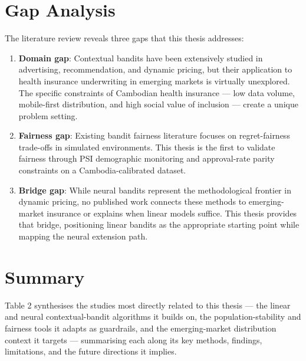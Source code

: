 \section{Gap Analysis}\label{gap-analysis}

The literature review reveals three gaps that this thesis addresses:

\begin{enumerate}
\def\labelenumi{\arabic{enumi}.}
\item
  \textbf{Domain gap}: Contextual bandits have been extensively studied in advertising, recommendation, and dynamic pricing, but their application to health insurance underwriting in emerging markets is virtually unexplored. The specific constraints of Cambodian health insurance --- low data volume, mobile-first distribution, and high social value of inclusion --- create a unique problem setting.
\item
  \textbf{Fairness gap}: Existing bandit fairness literature focuses on regret-fairness trade-offs in simulated environments. This thesis is the first to validate fairness through PSI demographic monitoring and approval-rate parity constraints on a Cambodia-calibrated dataset.
\item
  \textbf{Bridge gap}: While neural bandits represent the methodological frontier in dynamic pricing, no published work connects these methods to emerging-market insurance or explains when linear models suffice. This thesis provides that bridge, positioning linear bandits as the appropriate starting point while mapping the neural extension path.
\end{enumerate}

\section{Summary}\label{summary}

Table 2 synthesises the studies most directly related to this thesis --- the linear and neural contextual-bandit algorithms it builds on, the population-stability and fairness tools it adapts as guardrails, and the emerging-market distribution context it targets --- summarising each along its key methods, findings, limitations, and the future directions it implies.

\label{tab:3.2}

